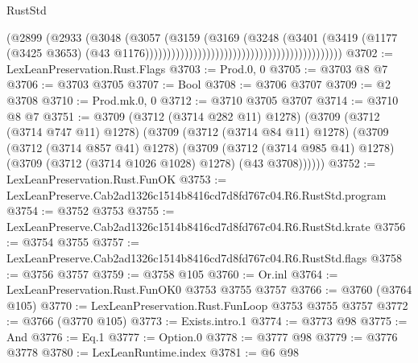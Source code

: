 \begin{lexlean}{RustStd}
\begin{coremodule}
                                                                        (@2899
                                                                          (@2933
                                                                            (@3048
                                                                              (@3057
                                                                                (@3159
                                                                                  (@3169
                                                                                    (@3248
                                                                                      (@3401
                                                                                        (@3419
                                                                                          (@1177
                                                                                            (@3425
                                                                                              @3653)
                                                                                            (@43
                                                                                              @1176)))))))))))))))))))))))))))))))))))))))))))))
@3702 := LexLeanPreservation.Rust.Flags
@3703 := Prod.{0, 0}
@3705 := @3703 @8 @7
@3706 := @3703 @3705
@3707 := Bool
@3708 := @3706 @3707
@3709 := @2 @3708
@3710 := Prod.mk.{0, 0}
@3712 := @3710 @3705 @3707
@3714 := @3710 @8 @7
@3751 := @3709
    (@3712 (@3714 @282 @11) @1278)
    (@3709
      (@3712 (@3714 @747 @11) @1278)
      (@3709
        (@3712 (@3714 @84 @11) @1278)
        (@3709
          (@3712 (@3714 @857 @41) @1278)
          (@3709
            (@3712 (@3714 @985 @41) @1278)
            (@3709 (@3712 (@3714 @1026 @1028) @1278) (@43 @3708))))))
@3752 := LexLeanPreservation.Rust.FunOK
@3753 := LexLeanPreserve.Cab2ad1326c1514b8416cd7d8fd767c04.R6.RustStd.program
@3754 := @3752 @3753
@3755 := LexLeanPreserve.Cab2ad1326c1514b8416cd7d8fd767c04.R6.RustStd.krate
@3756 := @3754 @3755
@3757 := LexLeanPreserve.Cab2ad1326c1514b8416cd7d8fd767c04.R6.RustStd.flags
@3758 := @3756 @3757
@3759 := @3758 @105
@3760 := Or.inl
@3764 := LexLeanPreservation.Rust.FunOK0 @3753 @3755 @3757
@3766 := @3760 (@3764 @105)
@3770 := LexLeanPreservation.Rust.FunLoop @3753 @3755 @3757
@3772 := @3766 (@3770 @105)
@3773 := Exists.intro.{1}
@3774 := @3773 @98
@3775 := And
@3776 := Eq.{1}
@3777 := Option.{0}
@3778 := @3777 @98
@3779 := @3776 @3778
@3780 := LexLeanRuntime.index
@3781 := @6 @98

\end{coremodule}
\end{lexlean}
